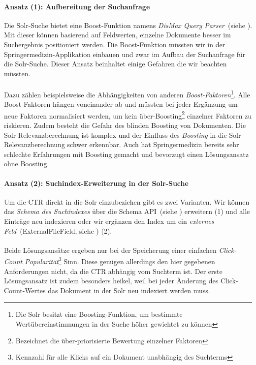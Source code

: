 \paragraph{Ansatz (1): Aufbereitung der Suchanfrage} Die Solr-Suche bietet eine Boost-Funktion namens \textit{DisMax Query Parser}~(siehe \cite{DisMax}). Mit dieser können basierend auf Feldwerten, einzelne Dokumente besser im Suchergebnis positioniert werden. Die Boost-Funktion müssten wir in der Springermedizin-Applikation einbauen und zwar im Aufbau der Suchanfrage für die Solr-Suche. Dieser Ansatz beinhaltet einige Gefahren die wir beachten müssten.
\\
\\
Dazu zählen beispielsweise die Abhängigkeiten von anderen \textit{Boost-Faktoren}\footnote{Die Solr besitzt eine Boosting-Funktion, um bestimmte Wertübereinstimmungen in der Suche höher gewichtet zu können}. Alle Boost-Faktoren hängen voneinander ab und müssten bei jeder Ergänzung um neue Faktoren normalisiert werden, um kein \glqq über-Boosting\grqq{}\footnote{Bezeichnet die über-priorisierte Bewertung einzelner Faktoren} einzelner Faktoren zu riskieren. Zudem besteht die Gefahr des \glqq blinden Boosting\grqq{} von Dokumenten. Die Solr-Relevanzberechnung ist komplex und der Einfluss des \textit{Boosting} in die Solr-Relevanzberechnung schwer erkennbar. Auch hat Springermedizin bereits sehr schlechte Erfahrungen mit Boosting gemacht und bevorzugt einen Lösungsansatz ohne Boosting.

\paragraph{Ansatz (2): Suchindex-Erweiterung in der Solr-Suche}
Um die CTR direkt in die Solr einzubeziehen gibt es zwei Varianten. Wir können das \textit{Schema des Suchindexes} über die Schema API~(siehe \cite{SchemaAPISolr}) erweitern (1) und alle Einträge neu indexieren oder wir ergänzen den Index um ein \textit{externes Feld}~(ExternalFileField, siehe \cite{ExtFieldSolr}) (2).
\\
\\
Beide Lösungsansätze ergeben nur bei der Speicherung einer einfachen \textit{Click-Count Popularität}\footnote{Kennzahl für alle Klicks auf ein Dokument unabhängig des Suchterms} Sinn. Diese genügen allerdings den hier gegebenen Anforderungen nicht, da die CTR abhängig vom Suchterm ist. Der erste Lösungsansatz ist zudem besonders heikel, weil bei jeder Änderung des Click-Count-Wertes das Dokument in der Solr neu indexiert werden muss.

